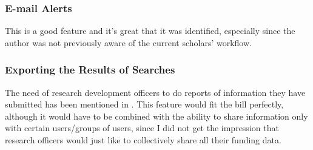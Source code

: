 


\subsubsection{E-mail Alerts}
This is a good feature and it's great that it was identified, especially since the author was not previously aware of the current scholars' workflow.

\label{future-research-officers-reports}

\subsubsection{Exporting the Results of Searches}
The need of research development officers to do reports of information they have submitted has been mentioned in . This feature would fit the bill perfectly, although it would have to be combined with the ability to share information only with certain users/groups of users, since I did not get the impression that research officers would just like to collectively share all their funding data.

